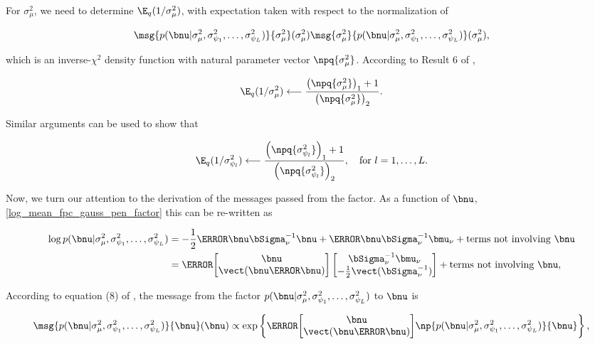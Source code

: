 \documentclass[12pt]{article}
\def\Sigmanu{\bSigma_{\nu}}
\def\munu{\bmu_{\nu}}
\def\sigsqmu{\sigma^2_{\mu}}
\newcommand\sigsqpsi[1]{\sigma^2_{\psi_{#1}}}
\newcommand\tni[1]{\text{terms not involving $#1$}}
\theoremstyle{plain}
\theoremstyle{definition}
\theoremstyle{remark}
\begin{document}
\noindent For $\sigsqmu$, we need to determine
$\E_q (1/\sigsqmu)$, with expectation taken with respect to the normalization of

\[
	\msg{p(\bnu | \sigsqmu, \sigsqpsi{1}, \dots, \sigsqpsi{L})}{\sigsqmu} (\sigsqmu)
	\msg{\sigsqmu}{p(\bnu | \sigsqmu, \sigsqpsi{1}, \dots, \sigsqpsi{L})} (\sigsqmu),
\]

\noindent which is an inverse-$\chi^2$ density function with natural parameter vector
$\npq{\sigsqmu}$. According to Result 6 of ,

\begin{equation}
	\E_q (1/\sigsqmu)
		\longleftarrow
			\frac{
				\left( \npq{\sigsqmu} \right)_1 + 1
			}{
				\left( \npq{\sigsqmu} \right)_2
			}.
\label{exp_pen_sigsqmu}
\end{equation}

\noindent Similar arguments can be used to show that

\begin{equation}
	\E_q (1/\sigsqpsi{l})
		\longleftarrow
			\frac{
				\left( \npq{\sigsqpsi{l}} \right)_1 + 1
			}{
				\left( \npq{\sigsqpsi{l}} \right)_2
			}, \quad \text{for $l = 1, \dots, L$.}
\label{exp_pen_sigsqpsi}
\end{equation}

Now, we turn our attention to the derivation of the messages passed from the factor. As a function of $\bnu$,
\eqref{log_mean_fpc_gauss_pen_factor} this can be re-written as

\begin{align*}
	\log p(\bnu | \sigsqmu, \sigsqpsi{1}, \dots, \sigsqpsi{L})
		& = -\frac12 \T{\bnu} \Sigmanu^{-1} \bnu + \T{\bnu} \Sigmanu^{-1} \munu + \tni{\bnu} \\
		& = \T{\begin{bmatrix}
			\bnu \\
			\vect (\bnu \T{\bnu})
		\end{bmatrix}} \begin{bmatrix}
			\Sigmanu^{-1} \munu \\
			-\frac12 \vect (\Sigmanu^{-1})
		\end{bmatrix} + \tni{\bnu},
\end{align*}

\noindent According to equation (8) of , the message from the factor $p(\bnu | \sigsqmu, \sigsqpsi{1}, \dots, \sigsqpsi{L})$
to $\bnu$ is

\[
	\msg{p (\bnu | \sigsqmu, \sigsqpsi{1}, \dots, \sigsqpsi{L})}{\bnu} (\bnu)
		\propto
			\exp \left\{
				\T{\begin{bmatrix}
					\bnu \\
					\vect (\bnu \T{\bnu})
				\end{bmatrix}}
				\np{p (\bnu | \sigsqmu, \sigsqpsi{1}, \dots, \sigsqpsi{L})}{\bnu}
			\right\},
\]
\end{document}
